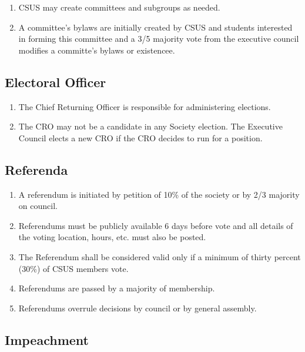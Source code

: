\begin{enumerate}
\def\labelenumi{\arabic{enumi}.}
\item
  CSUS may create committees and subgroups as needed.
\item
  A committee's bylaws are initially created by CSUS and students
  interested in forming this committee and a 3/5 majority vote from the
  executive council modifies a committe's bylaws or existencee.
\end{enumerate}

\subsection{Electoral Officer}\label{electoral-officer}

\begin{enumerate}
\def\labelenumi{\arabic{enumi}.}
\item
  The Chief Returning Officer is responsible for administering
  elections.
\item
  The CRO may not be a candidate in any Society election. The Executive
  Council elects a new CRO if the CRO decides to run for a position.
\end{enumerate}

\subsection{Referenda}\label{referenda}

\begin{enumerate}
\def\labelenumi{\arabic{enumi}.}
\item
  A referendum is initiated by petition of 10\% of the society or by 2/3
  majority on council.
\item
  Referendums must be publicly available 6 days before vote and all
  details of the voting location, hours, etc. must also be posted.
\item
  The Referendum shall be considered valid only if a minimum of thirty
  percent (30\%) of CSUS members vote.
\item
  Referendums are passed by a majority of membership.
\item
  Referendums overrule decisions by council or by general assembly.
\end{enumerate}

\subsection{Impeachment}\label{impeachment}

